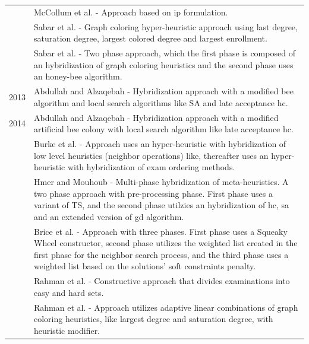 \begin{table}
\begin{tabular}{@{\,}r <{\hskip 2pt} !{\foo} >{\raggedright\arraybackslash}p{15cm}}
		& McCollum et al. - Approach based on \gls{ip} formulation.\\
		& Sabar et al. - Graph coloring hyper-heuristic approach using last degree, saturation degree, largest colored degree and largest enrollment.\\
		& Sabar et al. - Two phase approach, which the first phase is composed of an hybridization of graph coloring heuristics and the second phase uses an honey-bee algorithm.\\
2013	& Abdullah and Alzaqebah - Hybridization approach with a modified bee algorithm and local search algorithms like SA and late acceptance \gls{hc}.\\
2014	& Abdullah and Alzaqebah - Hybridization approach with a modified artificial bee colony with local search algorithm like late acceptance \gls{hc}.\\
		& Burke et al. - Approach uses an hyper-heuristic with hybridization of low level heuristics (neighbor operations) like, thereafter uses an hyper-heuristic with hybridization of exam ordering methods.\\
		& Hmer and Mouhoub - Multi-phase hybridization of meta-heuristics. A two phase approach with pre-processing phase. First phase uses a variant of TS, and the second phase utilzies an hybridization of \gls{hc}, \gls{sa} and an extended version of \gls{gd} algorithm.\\
		& Brice et al. - Approach with three phases. First phase uses a Squeaky Wheel constructor, second phase utilizes the weighted list created in the first phase for the neighbor search process, and the third phase uses a weighted list based on the solutions' soft constraints penalty.\\
		& Rahman et al. - Constructive approach that divides examinations into easy and hard sets.\\
		& Rahman et al. - Approach utilizes adaptive linear combinations of graph coloring heuristics, like largest degree and saturation degree, with heuristic modifier.\\
		
\end{tabular}
\label{table:timetable}
\end{table}
